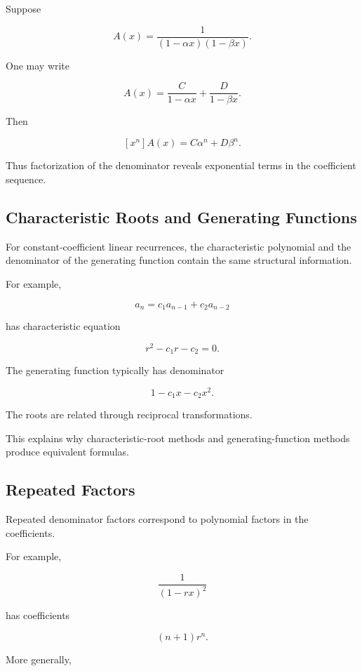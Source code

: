 Suppose

\[
A(x)
=
\frac{1}{(1-\alpha x)(1-\beta x)}.
\]

One may write

\[
A(x)
=
\frac{C}{1-\alpha x}
+
\frac{D}{1-\beta x}.
\]

Then

\[
[x^n]A(x)
=
C\alpha^n+D\beta^n.
\]

Thus factorization of the denominator reveals exponential terms in the
coefficient sequence.

\subsection{Characteristic Roots and Generating Functions}
\label{subsec:characteristic-roots-gf}

For constant-coefficient linear recurrences, the characteristic
polynomial and the denominator of the generating function contain the
same structural information.

For example,

\[
a_n
=
c_1a_{n-1}
+
c_2a_{n-2}
\]

has characteristic equation

\[
r^2-c_1r-c_2=0.
\]

The generating function typically has denominator

\[
\boxed{
1-c_1x-c_2x^2.
}
\]

The roots are related through reciprocal transformations.

This explains why characteristic-root methods and generating-function
methods produce equivalent formulas.

\subsection{Repeated Factors}
\label{subsec:gf-repeated-factors}

Repeated denominator factors correspond to polynomial factors in the
coefficients.

For example,

\[
\frac{1}{(1-rx)^2}
\]

has coefficients

\[
(n+1)r^n.
\]

More generally,


